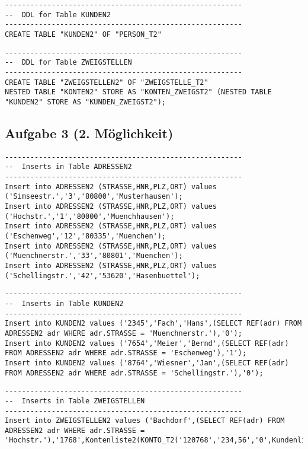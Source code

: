 \documentclass{scrartcl}
\begin{document}
\begin{lstlisting}
--------------------------------------------------------
--  DDL for Table KUNDEN2
--------------------------------------------------------
CREATE TABLE "KUNDEN2" OF "PERSON_T2" 
\end{lstlisting}
\begin{lstlisting}
--------------------------------------------------------
--  DDL for Table ZWEIGSTELLEN
--------------------------------------------------------
CREATE TABLE "ZWEIGSTELLEN2" OF "ZWEIGSTELLE_T2" 
NESTED TABLE "KONTEN2" STORE AS "KONTEN_ZWEIGST2" (NESTED TABLE "KUNDEN2" STORE AS "KUNDEN_ZWEIGST2");
\end{lstlisting}
\begin{landscape}
\section*{Aufgabe 3 (2. Möglichkeit)}
\begin{lstlisting}
--------------------------------------------------------
--  Inserts in Table ADRESSEN2
--------------------------------------------------------
Insert into ADRESSEN2 (STRASSE,HNR,PLZ,ORT) values ('Simseestr.','3','80800','Musterhausen');
Insert into ADRESSEN2 (STRASSE,HNR,PLZ,ORT) values ('Hochstr.','1','80000','Muenchhausen');
Insert into ADRESSEN2 (STRASSE,HNR,PLZ,ORT) values ('Eschenweg','12','80335','Muenchen');
Insert into ADRESSEN2 (STRASSE,HNR,PLZ,ORT) values ('Muenchnerstr.','33','80801','Muenchen');
Insert into ADRESSEN2 (STRASSE,HNR,PLZ,ORT) values ('Schellingstr.','42','53620','Hasenbuettel');
\end{lstlisting}
\begin{lstlisting}
--------------------------------------------------------
--  Inserts in Table KUNDEN2
--------------------------------------------------------
Insert into KUNDEN2 values ('2345','Fach','Hans',(SELECT REF(adr) FROM ADRESSEN2 adr WHERE adr.STRASSE = 'Muenchnerstr.'),'0');
Insert into KUNDEN2 values ('7654','Meier','Bernd',(SELECT REF(adr) FROM ADRESSEN2 adr WHERE adr.STRASSE = 'Eschenweg'),'1');
Insert into KUNDEN2 values ('8764','Wiesner','Jan',(SELECT REF(adr) FROM ADRESSEN2 adr WHERE adr.STRASSE = 'Schellingstr.'),'0');
\end{lstlisting}
\begin{lstlisting}
--------------------------------------------------------
--  Inserts in Table ZWEIGSTELLEN
--------------------------------------------------------
Insert into ZWEIGSTELLEN2 values ('Bachdorf',(SELECT REF(adr) FROM ADRESSEN2 adr WHERE adr.STRASSE = 'Hochstr.'),'1768',Kontenliste2(KONTO_T2('120768','234,56','0',Kundenliste2()),KONTO_T2('348973','12567,56','1',Kundenliste2()),KONTO_T2('678453','-456,78','1',Kundenliste2())));

\end{lstlisting}
\end{landscape}
\end{document}
